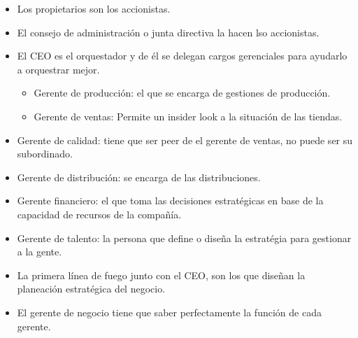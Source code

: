 \begin{itemize}
\begin{center}
        \end{center}
        \begin{itemize}
            \item Los propietarios son los accionistas.
            \item El consejo de administración o junta directiva la hacen lso accionistas.
            \item El CEO es el orquestador y de él se delegan cargos gerenciales para ayudarlo a orquestrar mejor.
                \begin{itemize}
                    \item Gerente de producción: el que se encarga de gestiones de producción.
                    \item Gerente de ventas: Permite un insider look a la situación de las tiendas.
                \end{itemize}
            
            \item Gerente de calidad: tiene que ser peer de el gerente de ventas, no puede ser su subordinado.
            \item Gerente de distribución: se encarga de las distribuciones.
            \item Gerente financiero: el que toma las decisiones estratégicas en base de la capacidad de recursos de la compañía.
            \item Gerente de talento: la persona que define o diseña la estratégia para gestionar a la gente.
        \end{itemize}
        \begin{itemize}[label=\#]
            \item La primera línea de fuego junto con el CEO, son los que diseñan la planeación estratégica del negocio.
            \item El gerente de negocio tiene que saber perfectamente la función de cada gerente.
        \end{itemize}
    

\end{itemize}

